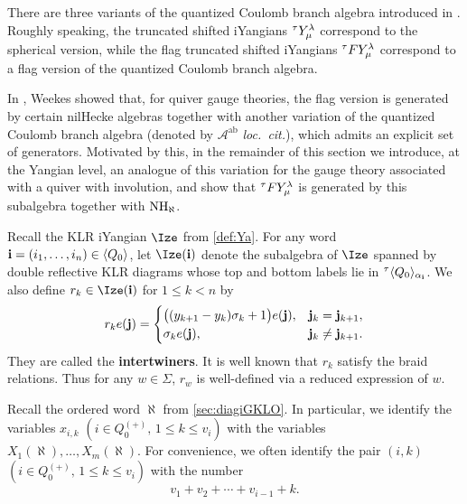 There are three variants of the quantized Coulomb branch algebra introduced in \cite{BFN18}.  
Roughly speaking, the truncated shifted iYangians ${}^\tau Y_\mu^\lambda$ correspond to the spherical version, while the flag truncated shifted iYangians ${}^\tau F Y_\mu^\lambda$ correspond to a flag version of the quantized Coulomb branch algebra.  

In \cite{We19}, Weekes showed that, for quiver gauge theories, the flag version is generated by certain nilHecke algebras together with another variation of the quantized Coulomb branch algebra (denoted by $\mathcal{A}^{\mathrm{ab}}$ \textit{loc.\ cit.}), which admits an explicit set of generators.  
Motivated by this, in the remainder of this section we introduce, at the Yangian level, an analogue of this variation for the gauge theory associated with a quiver with involution, and show that ${}^\tau F Y_\mu^\lambda$ is generated by this subalgebra together with $\operatorname{NH}_\aleph$.

Recall the KLR iYangian $\tR$ from \cref{def:Ya}.  
For any word $\mathbf{i}=(i_1,\ldots,i_n)\in \langle Q_0 \rangle$, let $\tR(\bi)$ denote the subalgebra of $\tR$ spanned by double reflective KLR diagrams whose top and bottom labels lie in ${}^\tau\langle Q_0\rangle_{\alpha_{\mathbf{i}}}$. We also define $r_k\in \tR(\bi)$ for $1\leq k<n$ by
\begin{equation}
\label{eq:intertw}
r_k e(\mathbf{j})=
\begin{cases}
\bigl((y_{k+1}-y_k)\sigma_k+1\bigr)e(\mathbf{j}),
& \mathbf{j}_k=\mathbf{j}_{k+1},\\
\sigma_k e(\mathbf{j}),
& \mathbf{j}_k\neq\mathbf{j}_{k+1}.
\end{cases}
\end{equation}
They are called the {\bf intertwiners}. It is well known that $r_k$ satisfy the braid relations. Thus for any $w\in \Sigma$, $r_w$ is well-defined via a reduced expression of $w$.

Recall the ordered word $\aleph$ from \cref{sec:diagiGKLO}.  
In particular, we identify the variables $x_{i,k}$ $(i\in Q_0^{(+)},\,1\le k\le v_i)$ with the variables
\(
X_1(\aleph),\ldots,X_m(\aleph).
\)
For convenience, we often identify the pair $(i,k)$ $(i\in Q_0^{(+)},\,1\le k\le v_i)$ with the number \begin{equation}
 \label{eq:pair}
 v_1+v_2+\cdots +v_{i-1}+k.
\end{equation} 

